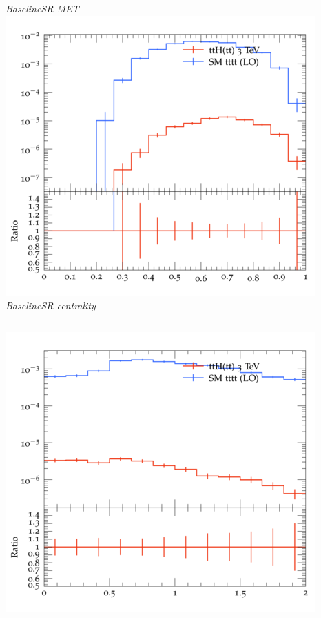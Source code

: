 \documentclass{beamer}
\begin{document}
\begin{frame}
\begin{columns}
\textit{\small BaselineSR MET}
\includegraphics[width=\textwidth]{../plots/ttH_3000/tttt_ttH_1LOS/BaselineSR_centrality.png}\\
\textit{\small BaselineSR centrality}
\end{columns}
\begin{columns}
\includegraphics[width=\textwidth]{../plots/ttH_3000/tttt_ttH_1LOS/BaselineSR_deltaR_bl_min.png}\\

\end{columns}
\end{frame}
\end{document}
